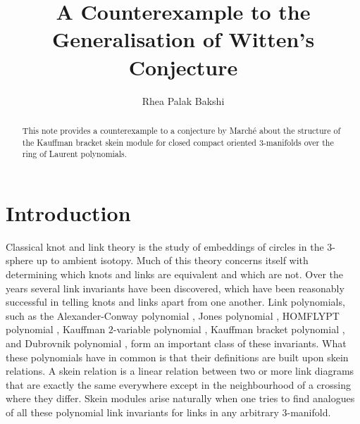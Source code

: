 \documentclass[12pt]{amsproc}
\title{A Counterexample to the %
Generalisation of Witten's Conjecture}
\author{Rhea Palak Bakshi}
\begin{document}
\begin{abstract}

This note provides a counterexample to a conjecture by Marché about the structure of the Kauffman bracket skein module for closed compact oriented $3$-manifolds over the ring of Laurent polynomials. 

\end{abstract}

\maketitle


\section{Introduction}\label{intromarche}

Classical knot and link theory is the study of embeddings of circles in the $3$-sphere up to ambient isotopy. Much of this theory concerns itself with determining which knots and links are equivalent and which are not. Over the years several link invariants have been discovered, which have been reasonably successful in telling knots and links apart from one another. Link polynomials, such as the Alexander-Conway polynomial \cite{Con}, Jones polynomial \cite{jonesannals}, HOMFLYPT polynomial \cite{homfly,homflypt}, Kauffman $2$-variable polynomial \cite{2variablekauffman}, Kauffman bracket polynomial \cite{sm&j}, and Dubrovnik polynomial \cite{2variablekauffman}, form an important class of these invariants. What these polynomials have in common is that their definitions are built upon skein relations. A skein relation is a linear relation between two or more link diagrams that are exactly the same everywhere except in the neighbourhood of a crossing where they differ. Skein modules arise naturally when one tries to find analogues of all these polynomial link invariants for links in any arbitrary $3$-manifold. \\
\end{document}
